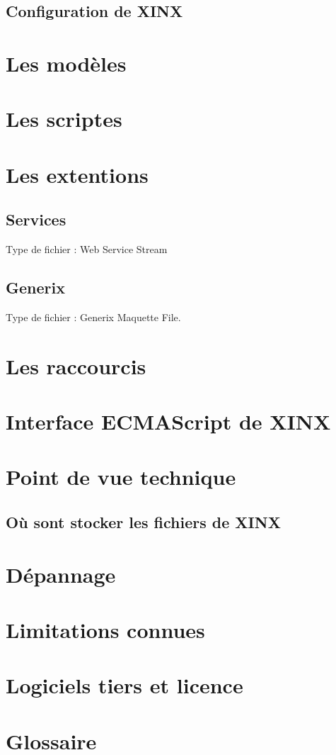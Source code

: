 \documentclass[a4paper,10pt,twoside]{book}
\begin{document}
\section{Configuration de XINX}

\chapter{Les modèles}

\chapter{Les scriptes}
\label{sec:Scripts}

\chapter{Les extentions}

\section{Services}
\label{sec:Services}


Type de fichier : Web Service Stream


\section{Generix}
\label{sec:Generix}

Type de fichier : Generix Maquette File.

\appendix
\chapter{Les raccourcis}

\chapter{Interface ECMAScript de XINX}

\chapter{Point de vue technique}

\section{Où sont stocker les fichiers de XINX}

\chapter{Dépannage}

\chapter{Limitations connues}

\chapter{Logiciels tiers et licence}

\chapter{Glossaire}
\end{document}
